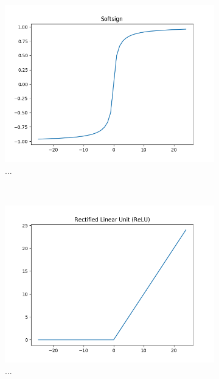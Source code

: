 \begin{figure}[t!]
\begin{subfigure}[t]{0.5\textwidth}
		\includegraphics[width=\textwidth]{img/methodology_neuralNetwork_activationFunction_softsign.png}
		\caption{...}
	\end{subfigure}%
	~ 
	\begin{subfigure}[t]{0.5\textwidth}
		\centering
		\includegraphics[width=\textwidth]{img/methodology_neuralNetwork_activationFunction_relu.png}
		\caption{...}
	\end{subfigure}
	~
	\begin{subfigure}[t]{0.5\textwidth}
		\centering

\end{subfigure}
\end{figure}
